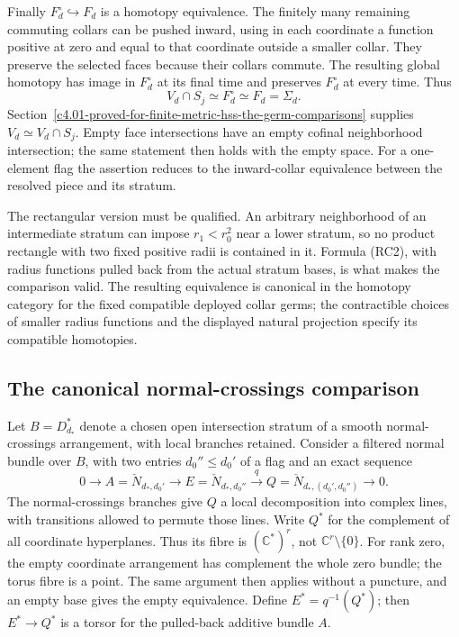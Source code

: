 \documentclass[11pt,a4paper]{article}
\theoremstyle{definition}
\begin{document}
Finally \(F_d^\circ\hookrightarrow F_d\) is a homotopy equivalence. The finitely many remaining commuting collars can be pushed inward, using in each coordinate a function positive at zero and equal to that coordinate outside a smaller collar. They preserve the selected faces because their collars commute. The resulting global homotopy has image in \(F_d^\circ\) at its final time and preserves \(F_d^\circ\) at every time. Thus
\[
 V_d\cap S_j\simeq F_d^\circ\simeq F_d=\Sigma_d.
\]
Section~\ref{c4.01-proved-for-finite-metric-hss-the-germ-comparisons} supplies \(V_d\simeq V_d\cap S_j\). Empty face intersections have an empty cofinal neighborhood intersection; the same statement then holds with the empty space. For a one-element flag the assertion reduces to the inward-collar equivalence between the resolved piece and its stratum.

The rectangular version must be qualified. An arbitrary neighborhood of an intermediate stratum can impose \(r_1<r_0^2\) near a lower stratum, so no product rectangle with two fixed positive radii is contained in it. Formula (RC2), with radius functions pulled back from the actual stratum bases, is what makes the comparison valid. The resulting equivalence is canonical in the homotopy category for the fixed compatible deployed collar germs; the contractible choices of smaller radius functions and the displayed natural projection specify its compatible homotopies.

\subsection{The canonical normal-crossings comparison}\label{c4.06-proved-the-canonical-normal-crossings-comparison}

Let \(B=D_{d_*}^*\) denote a chosen open intersection stratum of a smooth normal-crossings arrangement, with local branches retained. Consider a filtered normal bundle over \(B\), with two entries \(d_0''\le d_0'\) of a flag and an exact sequence \[
 0\longrightarrow A=\check N_{d_*,d_0'}
 \longrightarrow E=\check N_{d_*,d_0''}
 \xrightarrow{q}Q=\check N_{d_*,(d_0',d_0'')}
 \longrightarrow0.
\] The normal-crossings branches give \(Q\) a local decomposition into complex lines, with transitions allowed to permute those lines. Write \(Q^*\) for the complement of all coordinate hyperplanes. Thus its fibre is \((\mathbb C^*)^r\), not \(\mathbb C^r\setminus\{0\}\). For rank zero, the empty coordinate arrangement has complement the whole zero bundle; the torus fibre is a point. The same argument then applies without a puncture, and an empty base gives the empty equivalence. Define \(E^*=q^{-1}(Q^*)\); then \(E^*\to Q^*\) is a torsor for the pulled-back additive bundle \(A\).
\end{document}
